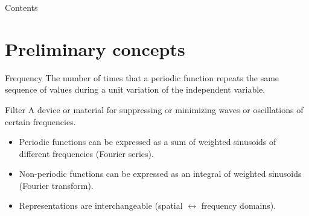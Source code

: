 


\subtitle{Filtering in the Frequency Domain}





\begin{frame}
\titlepage %
\end{frame}


\begin{frame}{Contents}
\setcounter{tocdepth}{1}
\tableofcontents
\end{frame}


\section{Preliminary concepts}


\begin{frame}
\begin{block}{Frequency}
The number of times that a periodic function repeats the same sequence of values during  a unit variation of the independent variable.
\end{block}
\begin{block}{Filter}
A device or material for suppressing or minimizing waves or oscillations of certain frequencies.
\end{block}
\end{frame}


\begin{frame}
\begin{itemize}
\item Periodic functions can be expressed as a sum of weighted sinusoids of different frequencies (Fourier series).
\item Non-periodic functions can be expressed as an integral of weighted sinusoids (Fourier transform).
\item Representations are interchangeable (spatial $\leftrightarrow$ frequency domains).
\end{itemize}
\end{frame}

